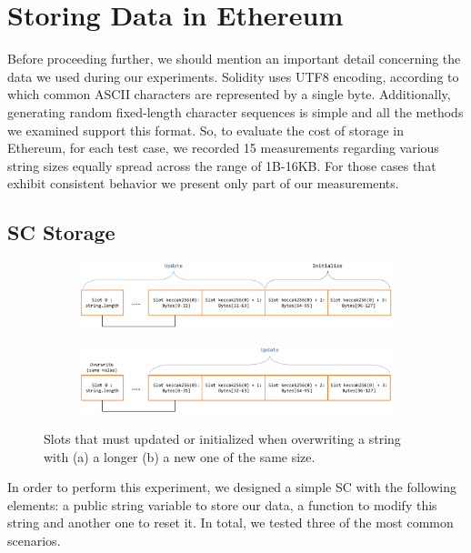 \section{Storing Data in Ethereum}\label{sec:evaluation_ethereum}
Before proceeding further, we should mention an important detail concerning the data we used during our experiments. Solidity uses UTF8 encoding, according to which common ASCII characters are represented by a single byte. Additionally, generating random fixed-length character sequences is simple and all the methods we examined support this format. So, to evaluate the cost of storage in Ethereum, for each test case, we recorded 15 measurements regarding various string sizes equally spread across the range of 1B-16KB. For those cases that exhibit consistent behavior we present only part of our measurements.

\subsection{SC Storage}\label{subsection:evaluation_sc}
\begin{figure}[htbp]
    \begin{subfigure}{\linewidth}
        \centerline{\includegraphics[width=\textwidth]{figs/Storage1.pdf}}
        \caption{}
        \label{fig:arrays_1}
    \end{subfigure}
    \begin{subfigure}{\linewidth}
        \centerline{\includegraphics[width=\textwidth]{figs/Storage2.pdf}}
        \caption{}
        \label{fig:arrays_2}
    \end{subfigure}
    \caption{Slots that must updated or initialized when overwriting a string with (a) a longer (b) a new one of the same size.}
\end{figure}

In order to perform this experiment, we designed a simple SC with the following elements: a public string variable to store our data, a function to modify this string and another one to reset it. In total, we tested three of the most common scenarios.

